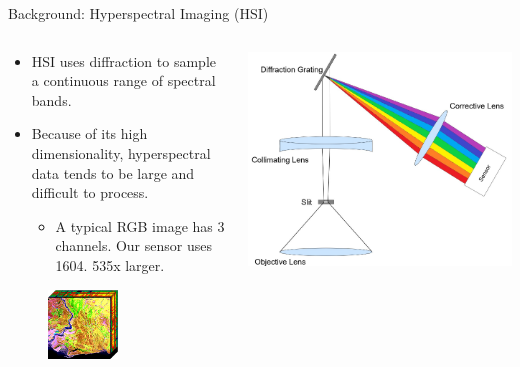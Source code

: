 \documentclass[aspectratio=169,xcolor=dvipsnames]{beamer}
\begin{document}
\begin{frame}{Background: Hyperspectral Imaging (HSI)}
    \begin{columns}
        \begin{column}{0.48\textwidth}
            \begin{itemize}
                \item HSI uses diffraction to sample a continuous range of spectral bands.
                \item Because of its high dimensionality, hyperspectral data tends to be large and difficult to process.
                \begin{itemize}
                    \item A typical RGB image has 3 channels. Our sensor uses 1604. 535x larger.
                \end{itemize}
            \end{itemize}
            \begin{figure}
                \centering
                \includegraphics[width=0.5\textwidth]{datacube.png}
            \end{figure}
        \end{column}
        \begin{column}{0.48\textwidth}
            \includegraphics[width=\textwidth]{hsi_optics.png}


\end{column}
\end{columns}
\end{frame}
\end{document}
